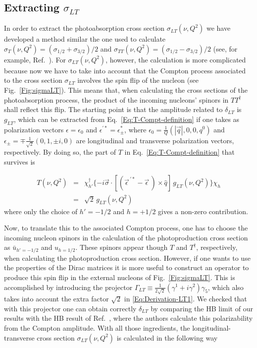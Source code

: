 \documentclass[prc,twocolumn,showpacs,preprintnumbers,amsmath,amssymb
,superscriptaddress,a4paper,nofootinbib
]{revtex4-1}
\begin{document}
\subsection{Extracting $\sigma_{LT}$}
\label{App:Extracting-SigmaLT}

In order to extract the photoabsorption cross section $\sigma_{LT}(\nu,Q^2)$ we have developed a method similar the one used to calculate $\sigma_T(\nu,Q^2)=(\sigma_{1/2}+\sigma_{3/2})/2$ and $\sigma_{TT}(\nu,Q^2)=(\sigma_{1/2}-\sigma_{3/2})/2$ (see, for example, Ref.~\cite{Holstein:2005db}). 
For $\sigma_{LT}(\nu,Q^2)$, however, the calculation is more complicated because now we have to take into account that the Compton process associated to the cross section $\sigma_{LT}$ involves the spin flip of the nucleon (see Fig.~\ref{Fig:sigmaLT}). This means that, when calculating the cross sections of the photoabsorption process, the product of the incoming nucleons' spinors in $T T^\dagger$ shall reflect this flip. 
The starting point is that the amplitude related to $\delta_{LT}$ is $g_{LT}$, which can be extracted from Eq.~\eqref{Eq:T-Compt-definition} if one takes as polarization vectors $\epsilon=\epsilon_0$ and $\epsilon^{'*}=\epsilon^*_\pm$, where $\epsilon_0=\frac{1}{Q}(|\vec{q}|,0,0,q^0)$ and $\epsilon_{\pm}=\mp\frac{1}{\sqrt{2}}(0,1,\pm i , 0)$ are longitudinal and transverse polarization vectors, respectively. 
By doing so, the part of $T$ in Eq.~\eqref{Eq:T-Compt-definition} that survives is 

\begin{eqnarray}\label{Eq:Derivation-LT1}
T(\nu,Q^2)&=& \chi^\dagger_{h'} \{- i \vec{\sigma}\cdot [(\vec{\epsilon}^{\, \prime *} - \vec{\epsilon}\,)\times \hat{q}] \, g_{LT}(\nu,Q^2)\} \chi_h \nonumber\\
&=& \sqrt{2}\, g_{LT}(\nu,Q^2)
\end{eqnarray}
where only the choice of $h'=-1/2$ and $h=+1/2$  gives a non-zero contribution. 



Now, to translate this to the associated Compton process, one has to choose the incoming nucleon spinors in the calculation of the photoproduction cross section as $\bar{u}_{h'=-1/2}$ and $u_{h=1/2}$. 
These spinors appear though $T$ and $T^\dagger$, respectively, when calculating the photoproduction cross section. However, if one wants to use the properties of the Dirac matrices it is more useful to construct an operator to produce this spin flip in the external nucleons of Fig.~\ref{Fig:sigmaLT}. 
This is accomplished by introducing the projector $\Gamma_{LT}\equiv \frac{1}{2\sqrt{2}}(\gamma^1+ i \gamma^2)\gamma_5$, which also takes into account the extra factor $\sqrt{2}$ in \eqref{Eq:Derivation-LT1}. 
We checked that with this projector one can obtain correctly $\delta_{LT}$ by comparing the HB limit of our results with the HB result of Ref.~\cite{Kao:2002cp}, where the authors calculate this polarizability from the Compton amplitude.
With all those ingredients, the longitudinal-transverse cross section $\sigma_{LT}(\nu,Q^2)$ is calculated in the following way
\end{document}
